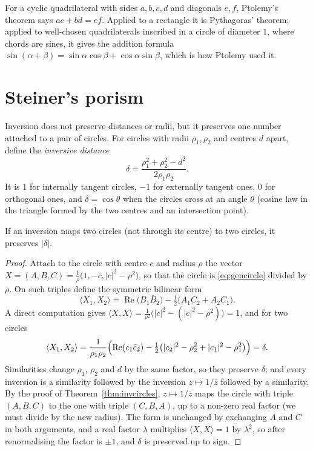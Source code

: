 For a cyclic quadrilateral with sides $a,b,c,d$ and diagonals $e,f$, Ptolemy's theorem says $ac+bd=ef$. Applied to a rectangle it is
Pythagoras' theorem; applied to well-chosen quadrilaterals inscribed in a circle of diameter $1$, where chords are sines, it gives the
addition formula $\sin(\alpha+\beta)=\sin\alpha\cos\beta+\cos\alpha\sin\beta$, which is how Ptolemy used it.

\section{Steiner's porism}

Inversion does not preserve distances or radii, but it preserves one number attached to a pair of circles. For circles with radii
$\rho_1,\rho_2$ and centres $d$ apart, define the \emph{inversive distance}
\[
\delta=\frac{\rho_1^2+\rho_2^2-d^2}{2\rho_1\rho_2}.
\]
It is $1$ for internally tangent circles, $-1$ for externally tangent ones, $0$ for orthogonal ones, and $\delta=\cos\theta$ when the circles
cross at an angle $\theta$ (cosine law in the triangle formed by the two centres and an intersection point).

\begin{proposition}\label{prop:invdistance}
If an inversion maps two circles (not through its centre) to two circles, it preserves $|\delta|$.
\end{proposition}
\begin{proof}
Attach to the circle with centre $c$ and radius $\rho$ the vector $X=(A,B,C)=\frac1\rho\bigl(1,-\bar c,|c|^2-\rho^2\bigr)$, so that the circle
is \eqref{eq:gencircle} divided by $\rho$. On such triples define the symmetric bilinear form
\[
\langle X_1,X_2\rangle=\operatorname{Re}\bigl(B_1\bar B_2\bigr)-\tfrac12\bigl(A_1C_2+A_2C_1\bigr).
\]
A direct computation gives $\langle X,X\rangle=\frac1{\rho^2}\bigl(|c|^2-(|c|^2-\rho^2)\bigr)=1$, and for two circles
\[
\langle X_1,X_2\rangle=\frac1{\rho_1\rho_2}\Bigl(\operatorname{Re}(c_1\bar c_2)-\tfrac12\bigl(|c_2|^2-\rho_2^2+|c_1|^2-\rho_1^2\bigr)\Bigr)=\delta .
\]
Similarities change $\rho_1$, $\rho_2$ and $d$ by the same factor, so they preserve $\delta$; and every inversion is a similarity followed by the
inversion $z\mapsto1/\bar z$ followed by a similarity. By the proof of Theorem~\ref{thm:invcircles}, $z\mapsto1/\bar z$ maps the circle with
triple $(A,B,C)$ to the one with triple $(C,B,A)$, up to a non-zero real factor (we must divide by the new radius). The form is unchanged by
exchanging $A$ and $C$ in both arguments, and a real factor $\lambda$ multiplies $\langle X,X\rangle=1$ by $\lambda^2$, so after renormalising
the factor is $\pm1$, and $\delta$ is preserved up to sign.
\end{proof}


